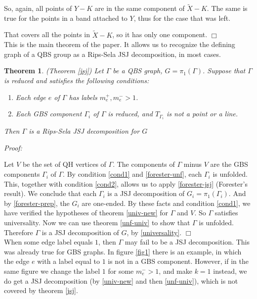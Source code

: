 \documentclass[12pt]{amsart}
\newtheorem{theorem}{Theorem}[section]
\begin{document}
So, again, all points of $Y-K$ are in the same component of $\tilde X -K$. The same is true for the points in a band attached to $Y$, thus for the case that was left.  

That covers all the points in $\tilde X -K$, so it has only one component.   $\Box$ \\


This is the main theorem of the paper. It allows us to recognize the defining graph of a QBS group as a Rips-Sela JSJ decomposition, in most cases.

\begin{theorem} (Theorem \ref{jsj}) Let $\Gamma$ be a QBS graph, $G=\pi_1(\Gamma)$. Suppose that $\Gamma$ is reduced and satisfies the following conditions:
\begin{enumerate}
\item \label{cond1} Each edge $e$ of $\Gamma$ has labels $m_e^+,m_e^->1$.
\item \label{cond2} Each GBS component $\Gamma_i$ of $\Gamma$ is reduced, and $T_{\Gamma_i}$ is not a point or a line.   
\end{enumerate}
Then $\Gamma$ is a Rips-Sela JSJ decomposition for $G$
\end{theorem}

{\em Proof:}

Let $V$ be the set of QH vertices of $\Gamma$. The components of $\Gamma$ minus $V$ are the GBS components $\Gamma_i$ of $\Gamma$. By condition \ref{cond1} and \ref{forester-unf}, each $\Gamma_i$ is unfolded. This, together with condition \ref{cond2}, allows us to apply \ref{forester-jsj} (Forester's result). We conclude that each $\Gamma_i$ is a JSJ decomposition of $G_i=\pi_1(\Gamma_i)$. And by \ref{forester-prep}, the $G_i$ are one-ended. By these facts and condition \ref{cond1}, we have verified the hypotheses of theorem \ref{univ-new} for $\Gamma$ and $V$. So $\Gamma$ satisfies universality. Now we can use theorem \ref{unf-univ} to show that $\Gamma$ is unfolded.
Therefore $\Gamma$ is a JSJ decomposition of $G$, by \ref{universality}. $\Box$ \\

When some edge label equals $1$, then $\Gamma$ may fail to be a JSJ decomposition. This was already true for GBS graphs. In figure \ref{fig1} there is an example, in which the edge $e$ with a label equal to $1$ is not in a GBS component. However, if in the same figure we change the label $1$ for some $m_e^->1$, and make $k=1$ instead, we do get a JSJ decomposition (by \ref{univ-new} and then \ref{unf-univ}), which is not covered by theorem \ref{jsj}. 
\end{document}
